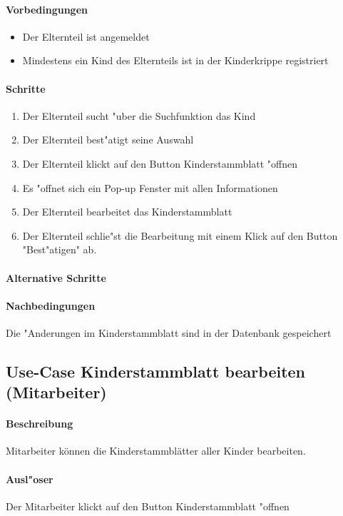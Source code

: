   \paragraph{Vorbedingungen}
  \begin{itemize}
  	\item Der Elternteil ist angemeldet
  	\item Mindestens ein Kind des Elternteils ist in der Kinderkrippe registriert
  \end{itemize}
  
  \paragraph{Schritte}
  \begin{enumerate}
  	\item Der Elternteil sucht "uber die Suchfunktion das Kind
  	\item Der Elternteil best"atigt seine Auswahl
  	\item Der Elternteil klickt auf den Button \dq Kinderstammblatt "offnen\dq
  	\item Es "offnet sich ein Pop-up Fenster mit allen Informationen
  	\item Der Elternteil bearbeitet das Kinderstammblatt
  	\item Der Elternteil schlie"st die Bearbeitung mit einem Klick auf den Button "Best"atigen" ab. 
  \end{enumerate}

  \paragraph{Alternative Schritte}
  \paragraph{Nachbedingungen}
  Die "Anderungen im Kinderstammblatt sind in der Datenbank gespeichert
  
  
  \newpage
  \subsection{Use-Case Kinderstammblatt bearbeiten (Mitarbeiter)}
  \paragraph{Beschreibung}
  Mitarbeiter können die Kinderstammblätter aller Kinder bearbeiten. 
  \paragraph{Ausl"oser}
  Der Mitarbeiter klickt auf den Button \dq Kinderstammblatt "offnen\dq
